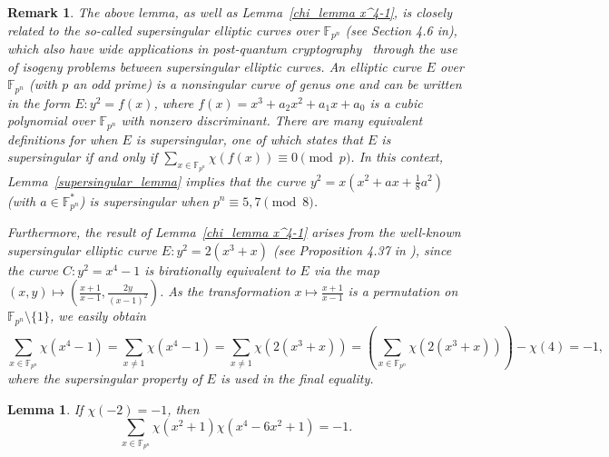 \documentclass[11pt]{article}
\numberwithin{theorem}{section}
\newtheorem{lemma}[theorem]{Lemma}
\newtheorem{remark}[theorem]{Remark}
\newcommand{\Sum}{\displaystyle \sum}
\newcommand{\Fpn}{\mathbb{F}_{p^n}}
\newcommand{\Fpnmul}{\mathbb{F}_{p^n}^*}
\begin{document}
	\begin{remark}
		The above lemma, as well as Lemma~\ref{chi_lemma x^4-1}, is closely related to the so-called supersingular elliptic curves over $\Fpn$ (see Section 4.6 in\cite{WASH08}), which also have wide applications in post-quantum cryptography~\cite{NIST19} through the use of isogeny problems between supersingular elliptic curves. An elliptic curve $E$ over $\Fpn$ (with $p$ an odd prime) is a nonsingular curve of genus one and can be written in the form $E\colon y^2 = f(x)$, where $f(x) = x^3 + a_2x^2 + a_1x + a_0$ is a cubic polynomial over $\Fpn$ with nonzero discriminant. There are many equivalent definitions for when $E$ is supersingular, one of which states that $E$ is supersingular if and only if $\Sum_{x\in \Fpn} \chi(f(x)) \equiv 0 \pmod{p}$. In this context, Lemma~\ref{supersingular_lemma} implies that the curve $y^2 = x\left(x^2 + ax + \tfrac{1}{8}a^2\right)$ (with $a \in \Fpnmul$) is supersingular when $p^n \equiv 5,7 \pmod{8}$.
		
		Furthermore, the result of Lemma~\ref{chi_lemma x^4-1} arises from the well-known supersingular elliptic curve $E\colon y^2 = 2(x^3 + x)$ (see Proposition 4.37 in \cite{WASH08}), since the curve $C\colon y^2 = x^4 - 1$ is birationally equivalent to $E$ via the map $(x, y) \mapsto \left(\frac{x+1}{x-1}, \frac{2y}{(x-1)^2} \right)$. As the transformation $x \mapsto \frac{x+1}{x-1}$ is a permutation on $\Fpn \setminus \{1\}$, we easily obtain 
		$$\Sum_{x\in \Fpn} \chi(x^4-1)=\Sum_{x\neq 1} \chi(x^4-1)=\Sum_{x\neq 1} \chi(2(x^3+x))=\left(\Sum_{x\in \Fpn} \chi(2(x^3+x))\right) - \chi(4)=-1,$$ 
		where the supersingular property of $E$ is used in the final equality.
	\end{remark}
	
	\begin{lemma}\label{BS_chi_lemma}
		If $\chi(-2)=-1$, then 
		\begin{equation*}
			\Sum_{x\in \Fpn} \chi(x^2+1)\chi(x^4-6x^2+1)=-1.
		\end{equation*}
	\end{lemma}
	
\end{document}
